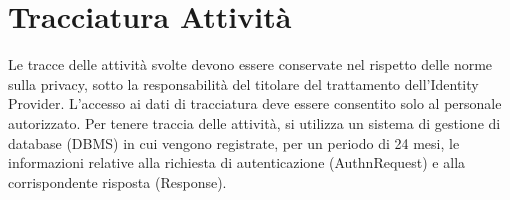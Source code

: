 
\section{Tracciatura Attività}
Le tracce delle attività svolte devono essere conservate nel rispetto delle norme sulla privacy, sotto la responsabilità del 
titolare del trattamento dell'Identity Provider. L'accesso ai dati di tracciatura deve essere consentito solo al personale 
autorizzato. Per tenere traccia delle attività, si utilizza un sistema di gestione di database (DBMS) in cui vengono registrate, 
per un periodo di 24 mesi, le informazioni relative alla richiesta di autenticazione (AuthnRequest) e alla corrispondente risposta 
(Response).
